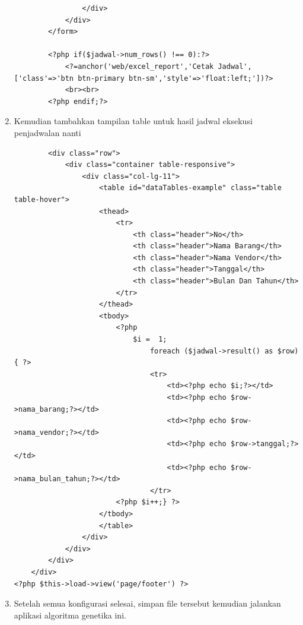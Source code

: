 \begin{enumerate}
\begin{lstlisting}
                </div>  
            </div>
        </form>

        <?php if($jadwal->num_rows() !== 0):?>
            <?=anchor('web/excel_report','Cetak Jadwal',['class'=>'btn btn-primary btn-sm','style'=>'float:left;'])?>
            <br><br>
        <?php endif;?>
\end{lstlisting}
    		
    	\item Kemudian tambahkan tampilan table untuk hasil jadwal eksekusi penjadwalan nanti
\begin{lstlisting}
        <div class="row">
            <div class="container table-responsive">
                <div class="col-lg-11">
                    <table id="dataTables-example" class="table table-hover">
                    <thead>
                        <tr>
                            <th class="header">No</th>
                            <th class="header">Nama Barang</th>
                            <th class="header">Nama Vendor</th>
                            <th class="header">Tanggal</th>
                            <th class="header">Bulan Dan Tahun</th>
                        </tr>
                    </thead>
                    <tbody>
                        <?php 
                            $i =  1;
                                foreach ($jadwal->result() as $row) { ?>
                                <tr>
                                    <td><?php echo $i;?></td>
                                    <td><?php echo $row->nama_barang;?></td>
                                    <td><?php echo $row->nama_vendor;?></td>
                                    <td><?php echo $row->tanggal;?></td>
                                    <td><?php echo $row->nama_bulan_tahun;?></td> 
                                </tr>
                        <?php $i++;} ?>
                    </tbody>
                    </table>
                </div>
            </div>
        </div>
    </div>
<?php $this->load->view('page/footer') ?>
\end{lstlisting}
    	
    	\item Setelah semua konfigurasi selesai, simpan file tersebut kemudian jalankan aplikasi algoritma genetika ini.
    	

\end{enumerate}
